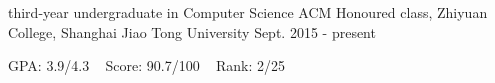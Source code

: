 

\begin{cventries}

  \cventry
    {third-year undergraduate in Computer Science} %
    {ACM Honoured class, Zhiyuan College, Shanghai Jiao Tong University} %
    {Sept. 2015 - present} %
    {} %
    {
      \begin{cvitems} %
          \item {GPA: 3.9/4.3 ~ Score: 90.7/100 ~ Rank: 2/25}
      \end{cvitems}
    }

\end{cventries}
